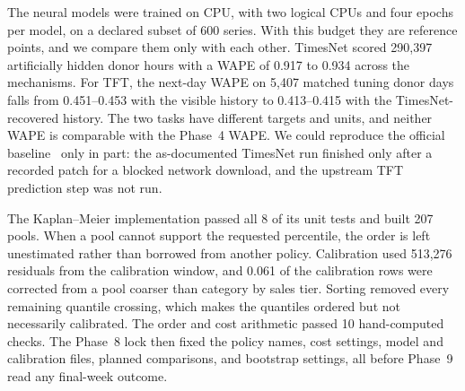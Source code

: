 \label{sec:complete}
\label{sec:deepdev}
The neural models were trained on CPU, with two logical CPUs and four epochs per model, on a declared subset of 600 series. With this budget they are reference points, and we compare them only with each other. TimesNet scored 290,397 artificially hidden donor hours with a WAPE of 0.917 to 0.934 across the mechanisms. For TFT, the next-day WAPE on 5,407 matched tuning donor days falls from 0.451--0.453 with the visible history to 0.413--0.415 with the TimesNet-recovered history. The two tasks have different targets and units, and neither WAPE is comparable with the Phase~4 WAPE. We could reproduce the official baseline~\cite{dingdong2025baseline} only in part: the as-documented TimesNet run finished only after a recorded patch for a blocked network download, and the upstream TFT prediction step was not run.

The Kaplan--Meier implementation passed all 8 of its unit tests and built 207 pools. When a pool cannot support the requested percentile, the order is left unestimated rather than borrowed from another policy. Calibration used 513,276 residuals from the calibration window, and 0.061 of the calibration rows were corrected from a pool coarser than category by sales tier. Sorting removed every remaining quantile crossing, which makes the quantiles ordered but not necessarily calibrated. The order and cost arithmetic passed 10 hand-computed checks. The Phase~8 lock then fixed the policy names, cost settings, model and calibration files, planned comparisons, and bootstrap settings, all before Phase~9 read any final-week outcome.
